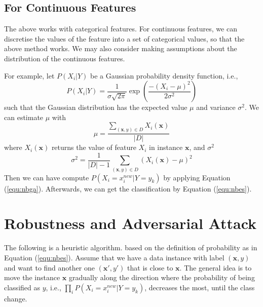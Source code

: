 \subsection*{For Continuous Features} The above works with categorical features. For continuous features, we can discretise the values of the feature into a set of categorical values, so that the above method works. We may also consider making assumptions about the distribution of the continuous features. 

For example, let $P(X_i|Y)$ be a Gaussian probability density function, i.e., 
\begin{equation}\label{equ:nbga}
    P(X_i|Y) = \frac{1}{\sigma\sqrt{2\pi}} \exp(\frac{-(X_i-\mu)^2}{2\sigma^2})
\end{equation}
such that the Gaussian distribution has the expected value $\mu$ and variance $\sigma^2$. We can estimate $\mu$ with 
\begin{equation}
    \mu = \frac{\sum_{(\textbf{x},y)\in D} X_i(\textbf{x})}{|D|}
\end{equation}
where $X_i(\textbf{x})$ returns the value of feature $X_i$ in instance $\textbf{x}$, and $\sigma^2$
\begin{equation}
    \sigma^2 = \frac{1}{|D|-1}\sum_{(\textbf{x},y)\in D} (X_i(\textbf{x})-\mu)^2
\end{equation}
Then we can have compute $P(X_i=x_i^{new}| Y=y_k)$ by applying Equation (\ref{equ:nbga}). Afterwards, we can get the classification by Equation (\ref{equ:nbes}). 

\section{Robustness and Adversarial Attack}

The following is a heuristic algorithm.
based on the definition of probability as in Equation (\ref{equ:nbes}). 
Assume that we have a data instance with label $(\textbf{x},y)$ and want to find another one $(\textbf{x}',y')$ that is close to $\textbf{x}$. The general idea is to move the instance $\textbf{x}$ gradually along the direction where the probability of being classified as $y$, i.e., $\prod_{i}P(X_i=x_i^{new}| Y=y_k)$,  decreases the most, until the class change. 

